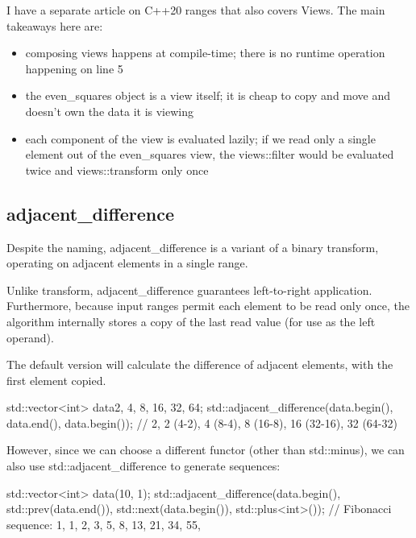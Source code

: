 I have a separate article on C++20 ranges that also covers Views. The main takeaways here are:

\begin{itemize}
    \item composing views happens at compile-time; there is no runtime operation happening on line 5
    \item the even\_squares object is a view itself; it is cheap to copy and move and doesn’t own the data it is viewing
    \item each component of the view is evaluated lazily; if we read only a single element out of the even\_squares view, the views::filter would be evaluated twice and views::transform only once
\end{itemize}

\subsection{adjacent\_difference}

Despite the naming, adjacent\_difference is a variant of a binary transform, operating on adjacent elements in a single range.

Unlike transform, adjacent\_difference guarantees left-to-right application. Furthermore, because input ranges permit each element to be read only once, the algorithm internally stores a copy of the last read value (for use as the left operand).



The default version will calculate the difference of adjacent elements, with the first element copied.

\begin{box-note}
\begin{cppcode}
std::vector<int> data{2, 4, 8, 16, 32, 64};
std::adjacent_difference(data.begin(), data.end(), data.begin());
// 2, 2 (4-2), 4 (8-4), 8 (16-8), 16 (32-16), 32 (64-32)
\end{cppcode}
\end{box-note}

However, since we can choose a different functor (other than std::minus), we can also use std::adjacent\_difference to generate sequences:

\begin{box-note}
\begin{cppcode}
std::vector<int> data(10, 1);
std::adjacent_difference(data.begin(), std::prev(data.end()), 
                         std::next(data.begin()), std::plus<int>());
// Fibonacci sequence: 1, 1, 2, 3, 5, 8, 13, 21, 34, 55,
\end{cppcode}
\end{box-note}

